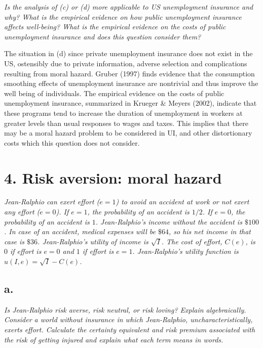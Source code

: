 \documentclass[
]{article}
\begin{document}
\textit{Is the analysis of (c) or (d) more applicable to US unemployment insurance and why? What is the empirical evidence on how public unemployment insurance affects well-being? What is the empirical evidence on the costs of public unemployment insurance and does this question consider them?}

The situation in (d) since private unemployment insurance does not exist
in the US, ostensibly due to private information, adverse selection and
complications resulting from moral hazard. Gruber (1997) finds evidence
that the consumption smoothing effects of unemployment insurance are
nontrivial and thus improve the well being of individuals. The empirical
evidence on the costs of public unemployment insurance, summarized in
Krueger \& Meyers (2002), indicate that these programs tend to increase
the duration of unemployment in workers at greater levels than usual
responses to wages and taxes. This implies that there may be a moral
hazard problem to be considered in UI, and other distortionary costs
which this question does not consider.

\hypertarget{risk-aversion-moral-hazard}{%
\section{4. Risk aversion: moral
hazard}\label{risk-aversion-moral-hazard}}

\textit{Jean-Ralphio can exert effort ($e = 1$) to avoid an accident at work or not exert any effort ($e = 0$). If $e = 1$, the probability of an accident is $1/2$. If $e = 0$, the probability of
an accident is $1$. Jean-Ralphio’s income without the accident is $\$100$. In case of an accident, medical
expenses will be $\$64$, so his net income in that case is $\$36$. Jean-Ralphio’s utility of income is $\sqrt{I}$. The cost of effort, $C(e)$, is $0$ if effort is $e = 0$ and $1$ if effort is $e = 1$. Jean-Ralphio’s utility function is
$u(I,e)= \sqrt{I}−C(e)$.}

\hypertarget{a.-3}{%
\subsection{a.}\label{a.-3}}

\textit{Is Jean-Ralphio risk averse, risk neutral, or risk loving? Explain algebraically. Consider a world without insurance in which Jean-Ralphio, uncharacteristically, exerts effort. Calculate the certainty equivalent and risk premium associated with the risk of getting injured and explain what each term means in words.}
\end{document}
